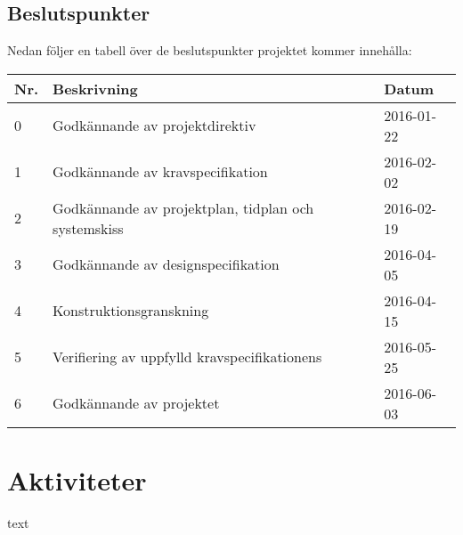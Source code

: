 \documentclass[11pt]{article}
\begin{document}
\begin{flushleft}
\begin{longtable}{| p{.05\linewidth} | p{.7\linewidth} | p{.15\linewidth} |}
\end{longtable}

\subsection{Beslutspunkter}
Nedan följer en tabell över de beslutspunkter projektet kommer innehålla:

\begin{longtable}{| p{.05\linewidth} | p{.7\linewidth} | p{.15\linewidth} |} \hline
\textbf{Nr.} & \textbf{Beskrivning} & \textbf{Datum} \\ \hline
0 & Godkännande av projektdirektiv & 2016-01-22 \\ \hline
1 & Godkännande av kravspecifikation & 2016-02-02 \\ \hline
2 & Godkännande av projektplan, tidplan och systemskiss & 2016-02-19 \\ \hline
3 & Godkännande av designspecifikation & 2016-04-05 \\ \hline
4 & Konstruktionsgranskning & 2016-04-15 \\ \hline
5 & Verifiering av uppfylld kravspecifikationens & 2016-05-25 \\ \hline
6 & Godkännande av projektet & 2016-06-03 \\ \hline

\end{longtable}

\pagebreak
\section{Aktiviteter}
text


\end{flushleft}
\end{document}
